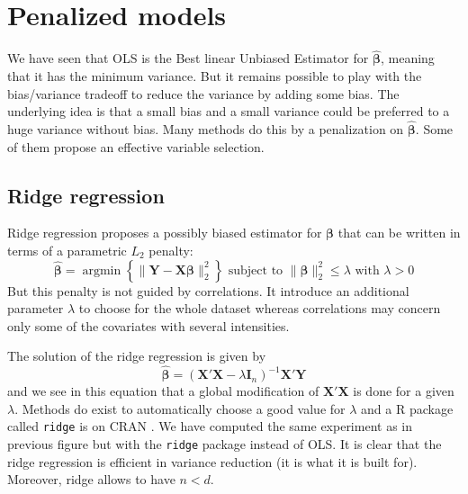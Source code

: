 \documentclass[12pt,a4paper]{report}
\begin{document}
	\section{Penalized models}
	
	We have seen that OLS is the Best linear Unbiased Estimator for $\hat{\boldsymbol{\beta}}$, meaning that it has the minimum variance. But it remains possible to play with the bias/variance tradeoff to reduce the variance by adding some bias. The underlying idea is that a small bias and a small variance could be preferred to a huge variance without bias. Many methods do this by a penalization on  $\hat{\boldsymbol{\beta}}$.  Some of them propose an effective variable selection.
		\subsection{Ridge regression}		%

Ridge regression \cite{hoerl1970ridge,marquardt1975ridge} proposes a possibly biased estimator for $\boldsymbol{\beta}$ that can be written in terms of a parametric $L_2$ penalty:
	\begin{equation}
		 \boldsymbol{\hat{\beta}}=\operatorname{argmin} \left\lbrace \parallel \boldsymbol{Y}-\boldsymbol{X\beta}\parallel_2^2 \right\rbrace \textrm{ subject to } \parallel \boldsymbol{\beta} \parallel_2^2\leq \lambda \textrm{ with } \lambda>0
	\end{equation}
	But this penalty is not guided by correlations. It introduce an additional parameter $\lambda$ to choose for the whole dataset  whereas correlations may concern only some of the covariates with several intensities.
	
	The solution of the ridge regression is given by
	\begin{equation}
		 \hat{\boldsymbol{\beta}}=\left(\boldsymbol{X}'\boldsymbol{X} -\lambda\boldsymbol{I}_n\right) ^{-1}\boldsymbol{X}'\boldsymbol{Y}\label{betaridge}
	\end{equation}
	and we see in this equation that a global modification of $\boldsymbol{X}'\boldsymbol{X}$ is done for a given $\lambda$. Methods do exist to automatically choose a good value for $\lambda$ \cite{cule2013ridge,er2013systematic} and a R package called {\tt ridge} is on CRAN \cite{packageridge}. 
	We have computed the same experiment as in previous figure but with the {\tt ridge} package instead of OLS. It is clear that the ridge regression is efficient in variance reduction (it is what it is built for). Moreover, ridge allows to have $n<d$.\\
	
\end{document}
